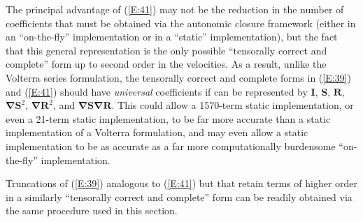 The principal advantage of (\ref{E:41}) may not be the reduction in the number of coefficients that must be obtained via the autonomic closure framework (either in an ``on-the-fly'' implementation or in a ``static'' implementation), but the fact that this general representation is the only possible ``tensorally correct and complete'' form up to second order in the velocities. As a result, unlike the Volterra series formulation, the tensorally correct and complete forms in (\ref{E:39}) and (\ref{E:41}) should have \textit{universal} coefficients   if   can be represented by $\mathbf{I}$, $\mathbf{S}$, $\mathbf{R}$, $\mathbf{\nabla S}^{2}$, $\mathbf{\nabla R}^{2}$, and $\mathbf{\nabla S \nabla R}$. This could allow a 1570-term static implementation, or even a 21-term static implementation, to be far more accurate than a static implementation of a Volterra formulation, and may even allow a static implementation to be as accurate as a far more computationally burdensome ``on-the-fly'' implementation.   

Truncations of (\ref{E:39}) analogous to (\ref{E:41}) but that retain terms of higher order in a similarly  ``tensorally correct and complete'' form can be readily obtained via the same procedure used in this section. 




